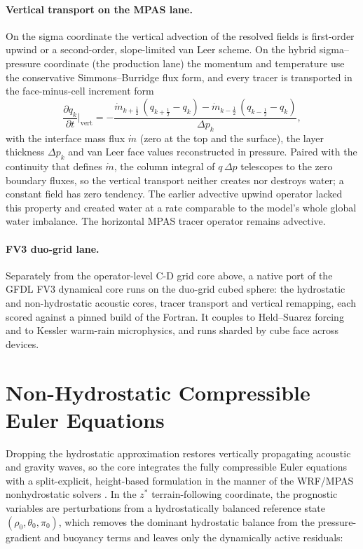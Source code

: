 \documentclass[11pt,twoside]{report}
\newcommand{\pp}{\partial}
\newcommand{\half}{\tfrac{1}{2}}
\begin{document}
\paragraph{Vertical transport on the MPAS lane.}
On the sigma coordinate the vertical advection of the resolved fields is
first-order upwind or a second-order, slope-limited van Leer scheme.  On the
hybrid sigma--pressure coordinate (the production lane) the momentum and
temperature use the conservative Simmons--Burridge flux form, and every
tracer is transported in the face-minus-cell increment form
\begin{equation}
  \frac{\pp q_k}{\pp t}\Big|_{\mathrm{vert}} =
  -\frac{\dot m_{k+\half}\,(q_{k+\half}-q_k)
         -\dot m_{k-\half}\,(q_{k-\half}-q_k)}{\Delta p_k},
\end{equation}
with the interface mass flux $\dot m$ (zero at the top and the surface), the
layer thickness $\Delta p_k$ and van Leer face values reconstructed in
pressure.  Paired with the continuity that defines $\dot m$, the column
integral of $q\,\Delta p$ telescopes to the zero boundary fluxes, so the
vertical transport neither creates nor destroys water; a constant field has
zero tendency.  The earlier advective upwind operator lacked this property
and created water at a rate comparable to the model's whole global water
imbalance.  The horizontal MPAS tracer operator remains advective.

\paragraph{FV3 duo-grid lane.}
Separately from the operator-level C-D grid core above, a native port of the
GFDL FV3 dynamical core runs on the duo-grid cubed sphere: the hydrostatic and
non-hydrostatic acoustic cores, tracer transport and vertical remapping,
each scored against a pinned build of the Fortran.  It couples to
Held--Suarez forcing and to Kessler warm-rain microphysics, and runs sharded
by cube face across devices.


\section{Non-Hydrostatic Compressible Euler Equations}
\label{sec:nh}

Dropping the hydrostatic approximation restores vertically propagating acoustic
and gravity waves, so the core integrates the fully compressible Euler equations
with a split-explicit, height-based formulation in the manner of the WRF/MPAS
nonhydrostatic solvers \citep{Klemp2007,SkamarockKlemp2008}. In the $z^*$
terrain-following coordinate, the prognostic variables are perturbations from a
hydrostatically balanced reference state $(\rho_0,\theta_0,\pi_0)$, which
removes the dominant hydrostatic balance from the pressure-gradient and buoyancy
terms and leaves only the dynamically active residuals:
\end{document}
